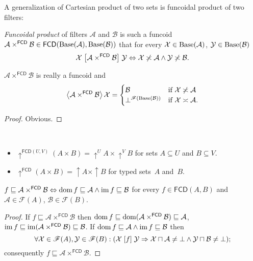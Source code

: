 A generalization of Cartesian product of two sets is funcoidal product
of two filters:
\begin{defn}
\emph{Funcoidal product} of filters $\mathcal{A}$
and $\mathcal{B}$ is such a funcoid
$\mathcal{A}\times^{\mathsf{FCD}}\mathcal{B}\in\mathsf{FCD}(\operatorname{Base}(\mathcal{A}
),\operatorname{Base}(\mathcal{B}))$
that for every $\mathcal{X}\in\operatorname{Base}(\mathcal{A})$,
$\mathcal{Y}\in\operatorname{Base}(\mathcal{B})$
\[
\mathcal{X}\mathrel{\left[\mathcal{A}\times^{\mathsf{FCD}}\mathcal{B}\right]}\mathcal{Y}
\Leftrightarrow\mathcal{X}\not\asymp\mathcal{A}\land\mathcal{Y}\not\asymp\mathcal{B}.
\]
\end{defn}
\begin{prop}
$\mathcal{A}\times^{\mathsf{FCD}}\mathcal{B}$ is really a funcoid
and
\[
\left\langle \mathcal{A}\times^{\mathsf{FCD}}\mathcal{B}\right\rangle\mathcal{X}=\begin{cases}
\mathcal{B} & \text{if }\mathcal{X}\not\asymp\mathcal{A}\\
\bot^{\mathscr{F}(\operatorname{Base}(\mathcal{B}))} & \text{if }\mathcal{X}\asymp\mathcal{A}.
\end{cases}
\]
\end{prop}
\begin{proof}
Obvious.\end{proof}
\begin{obvious}
~
\begin{itemize}
\item $\uparrow^{\mathsf{FCD}(U,V)}(A\times B)=\uparrow^{U}A\times\uparrow^{V}B$
for sets $A\subseteq U$ and $B\subseteq V$.
\item $\uparrow^{\mathsf{FCD}}(A\times B)=\uparrow A\times\uparrow B$ for
typed sets~$A$ and~$B$.
\end{itemize}
\end{obvious}
\begin{prop}
$f\sqsubseteq\mathcal{A}\times^{\mathsf{FCD}}\mathcal{B}\Leftrightarrow\operatorname{dom}
f\sqsubseteq\mathcal{A}\land\operatorname{im} f\sqsubseteq\mathcal{B}$
for every $f\in\mathsf{FCD}(A,B)$ and $\mathcal{A}\in\mathscr{F}(A)$,
$\mathcal{B}\in\mathscr{F}(B)$.\end{prop}
\begin{proof}
If $f\sqsubseteq\mathcal{A}\times^{\mathsf{FCD}}\mathcal{B}$ then
$\operatorname{dom}
f\sqsubseteq\operatorname{dom}(\mathcal{A}\times^{\mathsf{FCD}}\mathcal{B})\sqsubseteq\mathcal
{A}$,
$\operatorname{im}
f\sqsubseteq\operatorname{im}(\mathcal{A}\times^{\mathsf{FCD}}\mathcal{B})\sqsubseteq\mathcal{
B}$.
If $\operatorname{dom} f\sqsubseteq\mathcal{A}\land\operatorname{im} f\sqsubseteq\mathcal{B}$
then
\[
\forall\mathcal{X}\in\mathscr{F}(A),\mathcal{Y}\in\mathscr{F}(B):(\mathcal{X}
\mathrel{\left[f\right]}\mathcal{Y}\Rightarrow\mathcal{X}\sqcap\mathcal{A}\ne\bot
\land\mathcal{Y}\sqcap\mathcal{B}\ne\bot);
\]
consequently $f\sqsubseteq\mathcal{A}\times^{\mathsf{FCD}}\mathcal{B}$.
\end{proof}
